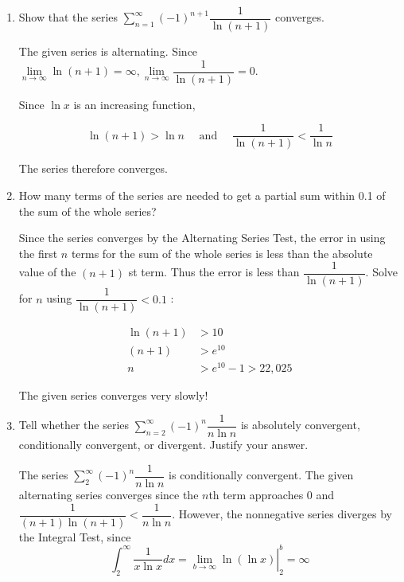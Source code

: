 \question
\begin{enumerate}
\renewcommand{\labelenumi}{(\alph{enumi})}
\item Show that the series $\sum_{n=1}^{\infty}(-1)^{n+1} \dfrac{1}{\ln (n+1)}$ converges.
\begin{solutionorbox}[1.5in]
The given series is alternating. Since $\lim\limits_{n \to \infty} \ln (n+1)=\infty, \lim\limits_{n \to \infty} \dfrac{1}{\ln (n+1)}=0$.

Since $\ln x$ is an increasing function,

\[
\ln (n+1)>\ln n \quad \text { and } \quad \dfrac{1}{\ln (n+1)}<\dfrac{1}{\ln n}
\]

The series therefore converges.
\end{solutionorbox}

\item How many terms of the series are needed to get a partial sum within 0.1 of the sum of the whole series?
\begin{solutionorbox}[2in]
Since the series converges by the Alternating Series Test, the error in using the first $n$ terms for the sum of the whole series is less than the absolute value of the $(n+1)$ st term. Thus the error is less than $\dfrac{1}{\ln (n+1)}$. Solve for $n$ using $\dfrac{1}{\ln (n+1)}<0.1$ :

\[
\begin{aligned}
\ln (n+1) & >10 \\
(n+1) & >e^{10} \\
n & >e^{10}-1>22,025
\end{aligned}
\]

The given series converges very slowly!
\end{solutionorbox}

\item Tell whether the series $\sum_{n=2}^{\infty}(-1)^{n} \dfrac{1}{n \ln n}$ is absolutely convergent, conditionally convergent, or divergent. Justify your answer.
\begin{solutionorbox}[1.5in]
The series $\sum_{2}^{\infty}(-1)^{n} \dfrac{1}{n \ln n}$ is conditionally convergent. The given alternating series converges since the $n$th term approaches 0 and $\dfrac{1}{(n+1) \ln (n+1)}<\dfrac{1}{n \ln n}$. However, the nonnegative series diverges by the Integral Test, since
\[
\int_{2}^{\infty} \dfrac{1}{x \ln x} d x=\left.\lim\limits_{b \to \infty} \ln (\ln x)\right|_{2} ^{b}=\infty
\]
\end{solutionorbox}
\end{enumerate}





